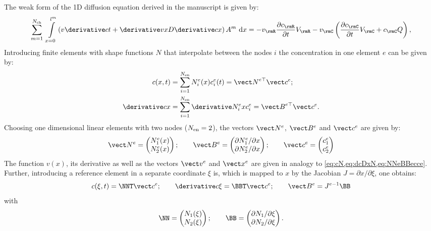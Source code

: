  
  The weak form of the 1D diffusion equation derived in the manuscript is given by:
  \begin{equation}
    \sumch \ \intlm \left( v \dcDt + \dvDx D \dcDx \right) \Am \ \rmd x= - v_\rmR \frac{\partial c_\rmR}{\partial t} V_\rmR - v_\rmC \left( \frac{\partial c_\rmC}{\partial t} V_\rmC + c_\rmC Q\right), 
    \label{eq:weakForm}
  \end{equation}  
  Introducing finite elements with shape functions $N$ that interpolate between the nodes $i$ the concentration in one element $e$ can be given by:
  \begin{align}
    c(x,t) &= \sumNen \Nie(x) \cie(t) = \NNeT \cce \label{eq:cN};\\
    \dcDx &= \sumNen \dNieDx c_i^e= \BBeT \cce.
    \label{eq:dcDxN}
  \end{align}
  Choosing one dimensional linear elements with two nodes ($N_{\rm en}=2$), the vectors $\NNe$, $\BBe$ and $\cce$ are given by:
  \begin{equation}
    \NNe = \begin{pmatrix} N_1^e(x) \\ N_2^e(x) \end{pmatrix}; \qquad 
    \BBe = \begin{pmatrix} \partial N_1^e / \partial x \\ \partial N_2^e / \partial x \end{pmatrix}; \qquad 
    \cce = \begin{pmatrix} c_1^e \\ c_2^e \end{pmatrix}
    \label{eq:NNeBBecce}
  \end{equation}
  The function $v(x)$, its derivative as well as the vectors $\vve$ and $\xxe$ are given in analogy to \cref{eq:cN,eq:dcDxN,eq:NNeBBecce}. Further, introducing a reference element in a separate coordinate $\xi$ is, which is mapped to $x$ by the Jacobian \mbox{$J=\partial x / \partial \xi$}, one obtains:
  \begin{equation}
    c(\xi,t) = \NNT \cce; \qquad \dcDxi = \BBT \cce; \qquad \BBe = \Jeinv \BB
  \end{equation}
  with
  \begin{equation}
    \NN = \begin{pmatrix} N_1(\xi) \\ N_2(\xi) \end{pmatrix}; \qquad 
    \BB = \begin{pmatrix} \partial N_1 / \partial \xi \\ \partial N_2 /\partial \xi \end{pmatrix}.
  \end{equation}
